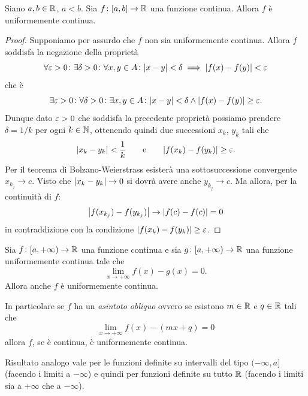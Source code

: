 \begin{theorem}
  \label{th:heine_cantor}%
  \mymark{***}%
Siano $a,b\in {\mathbb R}$, $a<b$.
Sia $f\colon [a,b]\to {\mathbb R}$ una funzione continua.
Allora $f$ è uniformemente continua.
\end{theorem}
%
\begin{proof}
\mymark{***}%
Supponiamo per assurdo che $f$ non sia uniformemente continua. Allora
$f$ soddisfa la negazione della proprietà
\[
 \forall \varepsilon>0\colon \exists \delta > 0 \colon
 \forall x,y\in A \colon {\left|x-y\right|} < \delta \implies {\left|f(x)-f(y)\right|} < \varepsilon
\]
che è
\[
 \exists \varepsilon>0\colon \forall \delta > 0 \colon
 \exists x,y \in A \colon {\left|x-y\right|} < \delta \land {\left|f(x)-f(y)\right|} \ge \varepsilon.
\]
Dunque dato $\varepsilon>0$ che soddisfa la precedente proprietà possiamo
prendere $\delta=1/k$
per ogni $k\in {\mathbb N}$, ottenendo quindi due successioni $x_k$, $y_k$ tali che
\[
  {\left|x_k-y_k\right|} < \frac 1 k \qquad\text{e}\qquad {\left|f(x_k) - f(y_k)\right|} \ge \varepsilon.
\]
Per il teorema di Bolzano-Weierstrass esisterà una sottosuccessione convergente $x_{k_j} \to c$.
Visto che ${\left|x_k-y_k\right|}\to 0$ si dovrà avere anche $y_{k_j}\to c$.
Ma allora, per la continuità di $f$:
\[
 {\left|f(x_{k_j})-f(y_{k_j})\right|} \to {\left|f(c) - f(c)\right|} = 0
\]
in contraddizione con la condizione ${\left|f(x_k)-f(y_k)\right|}\ge \varepsilon$.
\end{proof}

\begin{theorem}
Sia $f\colon [a,+\infty) \to {\mathbb R}$ una funzione continua e sia $g\colon [a,+\infty) \to {\mathbb R}$ una funzione uniformemente continua tale che
\[
  \lim_{x\to +\infty} f(x) - g(x) = 0.
\]
Allora anche $f$ è uniformemente continua.

In particolare se $f$ ha un \emph{asintoto obliquo}%
%
 ovvero se esistono $m\in {\mathbb R}$ e $q\in {\mathbb R}$ tali che
\[
  \lim_{x\to +\infty} f(x) - (mx + q)  = 0
\]
allora $f$, se è continua, è uniformemente continua.

Risultato analogo vale per le funzioni definite su intervalli del tipo $(-\infty,a]$ (facendo i limiti a $-\infty$) e quindi per funzioni definite su tutto ${\mathbb R}$ (facendo i limiti sia a $+\infty$ che a $-\infty$).
\end{theorem}

